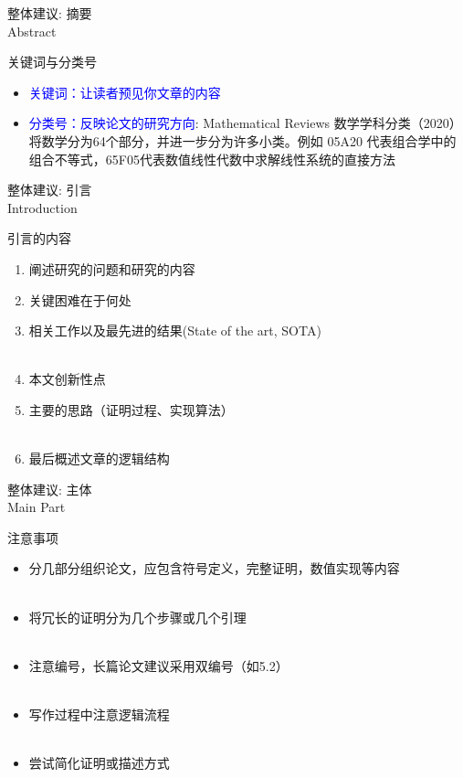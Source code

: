\documentclass[UTF8]{ctexbeamer}
\begin{document}
\begin{frame}{整体建议: 摘要 \\ Abstract}
\begin{alertblock}{关键词与分类号}
\begin{itemize}
    \item \textcolor{blue}{关键词：让读者预见你文章的内容}
    \item \textcolor{blue}{分类号：反映论文的研究方向}: Mathematical Reviews 数学学科分类（2020）将数学分为64个部分，并进一步分为许多小类。例如 05A20 代表组合学中的组合不等式，65F05代表数值线性代数中求解线性系统的直接方法
\end{itemize}
\end{alertblock}
\end{frame}


\begin{frame}{整体建议: 引言 \\ Introduction}
\begin{alertblock}{引言的内容} 
\begin{enumerate}
    \item 阐述研究的问题和研究的内容
    \item 关键困难在于何处
    \item 相关工作以及最先进的结果(State of the art, SOTA) \\ \ \\
    \item 本文创新性点
    \item 主要的思路（证明过程、实现算法）\\ \ \\
    \item 最后概述文章的逻辑结构
\end{enumerate}
\end{alertblock}
\end{frame}

\begin{frame}{整体建议: 主体 \\ Main Part}
\begin{alertblock}{注意事项}
\begin{itemize}
    \item 分几部分组织论文，应包含符号定义，完整证明，数值实现等内容\\ \ \\
    \item 将冗长的证明分为几个步骤或几个引理\\ \ \\
    \item 注意编号，长篇论文建议采用双编号（如5.2）\\ \ \\
    \item 写作过程中注意逻辑流程\\ \ \\
    \item 尝试简化证明或描述方式
\end{itemize}
\end{alertblock}
\end{frame}
\end{document}
